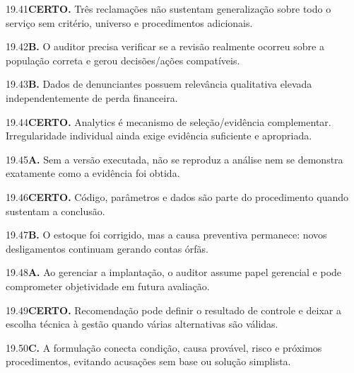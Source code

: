 \begin{solucao}{19.41}\textbf{CERTO.} Três reclamações não sustentam generalização sobre todo o serviço sem critério, universo e procedimentos adicionais.\end{solucao}
\begin{solucao}{19.42}\textbf{B.} O auditor precisa verificar se a revisão realmente ocorreu sobre a população correta e gerou decisões/ações compatíveis.\end{solucao}
\begin{solucao}{19.43}\textbf{B.} Dados de denunciantes possuem relevância qualitativa elevada independentemente de perda financeira.\end{solucao}
\begin{solucao}{19.44}\textbf{CERTO.} Analytics é mecanismo de seleção/evidência complementar. Irregularidade individual ainda exige evidência suficiente e apropriada.\end{solucao}
\begin{solucao}{19.45}\textbf{A.} Sem a versão executada, não se reproduz a análise nem se demonstra exatamente como a evidência foi obtida.\end{solucao}
\begin{solucao}{19.46}\textbf{CERTO.} Código, parâmetros e dados são parte do procedimento quando sustentam a conclusão.\end{solucao}
\begin{solucao}{19.47}\textbf{B.} O estoque foi corrigido, mas a causa preventiva permanece: novos desligamentos continuam gerando contas órfãs.\end{solucao}
\begin{solucao}{19.48}\textbf{A.} Ao gerenciar a implantação, o auditor assume papel gerencial e pode comprometer objetividade em futura avaliação.\end{solucao}
\begin{solucao}{19.49}\textbf{CERTO.} Recomendação pode definir o resultado de controle e deixar a escolha técnica à gestão quando várias alternativas são válidas.\end{solucao}
\begin{solucao}{19.50}\textbf{C.} A formulação conecta condição, causa provável, risco e próximos procedimentos, evitando acusações sem base ou solução simplista.\end{solucao}
